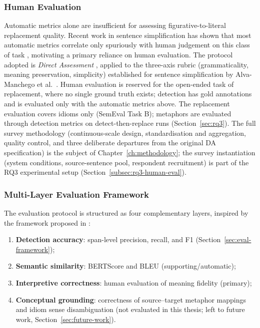 \subsubsection{Human Evaluation}

Automatic metrics alone are insufficient for assessing figurative-to-literal replacement quality. Recent work in sentence simplification has shown that most automatic metrics correlate only spuriously with human judgement on this class of task \cite{Alva-Manchego2021,Scialom2021}, motivating a primary reliance on human evaluation. The protocol adopted is \textit{Direct Assessment} \cite{Graham2013,Graham2017}, applied to the three-axis rubric (grammaticality, meaning preservation, simplicity) established for sentence simplification by Alva-Manchego et al.\ \cite{Alva-Manchego2020}. Human evaluation is reserved for the open-ended task of replacement, where no single ground truth exists; detection has gold annotations and is evaluated only with the automatic metrics above. The replacement evaluation covers idioms only (SemEval Task B); metaphors are evaluated through detection metrics on detect-then-replace runs (Section~\ref{sec:rq3}). The full survey methodology (continuous-scale design, standardisation and aggregation, quality control, and three deliberate departures from the original DA specification) is the subject of Chapter~\ref{ch:methodology}; the survey instantiation (system conditions, source-sentence pool, respondent recruitment) is part of the RQ3 experimental setup (Section~\ref{subsec:rq3-human-eval}).

\subsubsection{Multi-Layer Evaluation Framework}

The evaluation protocol is structured as four complementary layers, inspired by the framework proposed in \cite{Surez-Figueroa2024}:
\begin{enumerate}
    \item \textbf{Detection accuracy}: span-level precision, recall, and F1 (Section~\ref{sec:eval-framework});
    \item \textbf{Semantic similarity}: BERTScore and BLEU (supporting/automatic);
    \item \textbf{Interpretive correctness}: human evaluation of meaning fidelity (primary);
    \item \textbf{Conceptual grounding}: correctness of source--target metaphor mappings and idiom sense disambiguation (not evaluated in this thesis; left to future work, Section~\ref{sec:future-work}).
\end{enumerate}

